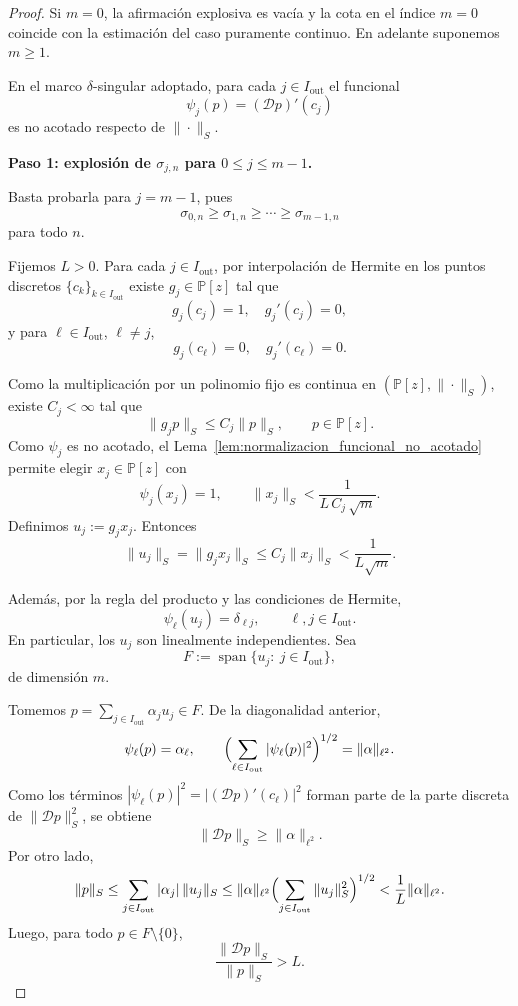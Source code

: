 \documentclass[12pt,a4paper]{article}
\theoremstyle{definition}
\theoremstyle{remark}
\newcommand{\Poly}{\mathbb{P}[z]}
\newcommand{\D}{\mathcal{D}}
\begin{document}
\begin{proof}
  Si $m=0$, la afirmación explosiva es vacía y la cota en el índice $m=0$ coincide con la
  estimación del caso puramente continuo. En adelante suponemos $m\ge 1$.

  En el marco $\delta$-singular adoptado, para cada $j\in I_{\mathrm{out}}$ el funcional
  \[
    \psi_j(p)=(\D p)'(c_j)
  \]
  es no acotado respecto de $\|\cdot\|_S$.

  \medskip
  \noindent
  \textbf{Paso 1: explosión de $\sigma_{j,n}$ para $0\le j\le m-1$.}

  Basta probarla para $j=m-1$, pues
  \[
    \sigma_{0,n}\ge\sigma_{1,n}\ge\cdots\ge\sigma_{m-1,n}
  \]
  para todo $n$.

  Fijemos $L>0$. Para cada $j\in I_{\mathrm{out}}$, por interpolación de Hermite en los
  puntos discretos $\{c_k\}_{k\in I_{\mathrm{out}}}$ existe $g_j\in\Poly$ tal que
  \[
    g_j(c_j)=1,\quad g_j'(c_j)=0,
  \]
  y para $\ell\in I_{\mathrm{out}}$, $\ell\ne j$,
  \[
    g_j(c_\ell)=0,\quad g_j'(c_\ell)=0.
  \]

  Como la multiplicación por un polinomio fijo es continua en
  $(\Poly,\|\cdot\|_S)$, existe $C_j<\infty$ tal que
  \[
    \|g_jp\|_S\le C_j\|p\|_S,
    \qquad p\in\Poly.
  \]
  Como $\psi_j$ es no acotado, el Lema~\ref{lem:normalizacion_funcional_no_acotado}
  permite elegir $x_j\in\Poly$ con
  \[
    \psi_j(x_j)=1,
    \qquad
    \|x_j\|_S<\frac{1}{L\,C_j\,\sqrt m}.
  \]
  Definimos $u_j:=g_jx_j$. Entonces
  \[
    \|u_j\|_S=\|g_jx_j\|_S\le C_j\|x_j\|_S<\frac{1}{L\sqrt m}.
  \]

  Además, por la regla del producto y las condiciones de Hermite,
  \[
    \psi_\ell(u_j)=\delta_{\ell j},
    \qquad \ell,j\in I_{\mathrm{out}}.
  \]
  En particular, los $u_j$ son linealmente independientes. Sea
  \[
    F:=\operatorname{span}\{u_j:\ j\in I_{\mathrm{out}}\},
  \]
  de dimensión $m$.

  Tomemos $p=\sum_{j\in I_{\mathrm{out}}}\alpha_ju_j\in F$. De la diagonalidad anterior,
  \[
    \psi_\ell(p)=\alpha_\ell,
    \qquad
    \Bigl(\sum_{\ell\in I_{\mathrm{out}}}|\psi_\ell(p)|^2\Bigr)^{1/2}=\|\alpha\|_{\ell^2}.
  \]
  Como los términos $|\psi_\ell(p)|^2=|(\D p)'(c_\ell)|^2$ forman parte de la parte
  discreta de $\|\D p\|_S^2$, se obtiene
  \[
    \|\D p\|_S\ge \|\alpha\|_{\ell^2}.
  \]
  Por otro lado,
  \[
    \|p\|_S
    \le
    \sum_{j\in I_{\mathrm{out}}}|\alpha_j|\,\|u_j\|_S
    \le
    \|\alpha\|_{\ell^2}\Bigl(\sum_{j\in I_{\mathrm{out}}}\|u_j\|_S^2\Bigr)^{1/2}
    <
    \frac1L\|\alpha\|_{\ell^2}.
  \]
  Luego, para todo $p\in F\setminus\{0\}$,
  \[
    \frac{\|\D p\|_S}{\|p\|_S}>L.
  \]


\end{proof}
\end{document}
